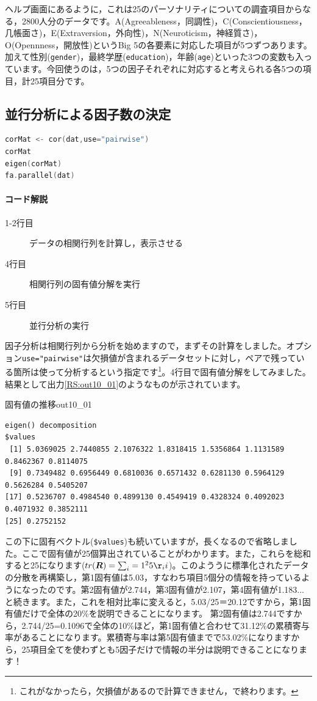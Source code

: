\documentclass{ltjsbook}
\begin{document}
ヘルプ画面にあるように，これは25のパーソナリティについての調査項目からなる，2800人分のデータです。A(Agreeableness，同調性)，C(Conscientiousness，几帳面さ)，E(Extraversion，外向性)，N(Neuroticism，神経質さ)，O(Opennness，開放性)というBig 5の各要素に対応した項目が5つずつあります。加えて性別(\texttt{gender})，最終学歴(\texttt{education})，年齢(\texttt{age})といった3つの変数も入っています。今回使うのは，5つの因子それぞれに対応すると考えられる各5つの項目，計25項目分です。

\subsection{並行分析による因子数の決定}
\begin{lstlisting}[language=c++,label={code::10_02},caption={データの構造を見る}]
corMat <- cor(dat,use="pairwise") 
corMat
eigen(corMat)
fa.parallel(dat)
\end{lstlisting}
\paragraph{コード解説}
\begin{description}
    \item[1-2行目] データの相関行列を計算し，表示させる
    \item[4行目] 相関行列の固有値分解を実行
    \item[5行目] 並行分析の実行
\end{description}

因子分析は相関行列から分析を始めますので，まずその計算をしました。オプション\texttt{use="pairwise"}は欠損値が含まれるデータセットに対し，ペアで残っている箇所は使って分析するという指定です\footnote{これがなかったら，欠損値があるので計算できません，で終わります。}。4行目で固有値分解をしてみました。結果として出力\ref{RS:out10_01}のようなものが示されています。

\begin{Rscreen}{固有値の推移}{out10_01}
    \begin{verbatim}
eigen() decomposition
$values
 [1] 5.0369025 2.7440855 2.1076322 1.8318415 1.5356864 1.1131589 0.8462367 0.8114075
 [9] 0.7349482 0.6956449 0.6810036 0.6571432 0.6281130 0.5964129 0.5626284 0.5405207
[17] 0.5236707 0.4984540 0.4899130 0.4549419 0.4328324 0.4092023 0.4071932 0.3852111
[25] 0.2752152
\end{verbatim}
\end{Rscreen}

この下に固有ベクトル(\verb|$values|)も続いていますが，長くなるので省略しました。ここで固有値が25個算出されていることがわかります。また，これらを総和すると25になります($tr(\bm{R})=\sum_i=1^25 \r_ii$)。このよううに標準化されたデータの分散を再構築し，第1固有値は5.03，すなわち項目5個分の情報を持っているようになったのです。第2固有値が2.744，第3固有値が2.107，第4固有値が1.183...と続きます。また，これを相対比率に変えると，5.03/25＝20.12ですから，第1固有値だけで全体の20\%を説明できることになります。
第2固有値は2.744ですから，2.744/25=0.1096で全体の10\%ほど，第1固有値と合わせて31.12\%の累積寄与率があることになります。累積寄与率は第5固有値までで53.02\%になりますから，25項目全てを使わずとも5因子だけで情報の半分は説明できることになります！
\end{document}
